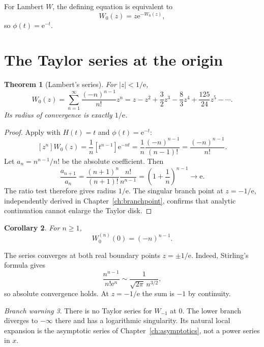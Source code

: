 \documentclass[11pt,oneside]{book}
\newtheorem{theorem}{Theorem}[chapter]
\newtheorem{corollary}[theorem]{Corollary}
\theoremstyle{definition}
\theoremstyle{remark}
\newtheorem{warning}[theorem]{Branch warning}
\newcommand{\ee}{\mathrm e}
\begin{document}
For Lambert $W$, the defining equation is equivalent to
\begin{equation}\label{eq:Wlagrange}
 W_0(z)=z\ee^{-W_0(z)},
\end{equation}
so $\phi(t)=\ee^{-t}$.

\section{The Taylor series at the origin}

\begin{theorem}[Lambert's series]\label{thm:lambertseries}
For $|z|<1/\ee$,
\begin{equation}\label{eq:Wseries}
 W_0(z)=\sum_{n=1}^{\infty}\frac{(-n)^{n-1}}{n!}z^n
 =z-z^2+\frac32z^3-\frac83z^4+\frac{125}{24}z^5-\cdots.
\end{equation}
Its radius of convergence is exactly $1/\ee$.
\end{theorem}

\begin{proof}
Apply  with $H(t)=t$ and $\phi(t)=\ee^{-t}$:
\[
 [z^n]W_0(z)=\frac1n[t^{n-1}]\ee^{-nt}
 =\frac1n\frac{(-n)^{n-1}}{(n-1)!}
 =\frac{(-n)^{n-1}}{n!}.
\]
Let $a_n=n^{n-1}/n!$ be the absolute coefficient.  Then
\[
 \frac{a_{n+1}}{a_n}
 =\frac{(n+1)^n}{(n+1)!}\frac{n!}{n^{n-1}}
 =\left(1+\frac1n\right)^{n-1}\longrightarrow\ee.
\]
The ratio test therefore gives radius $1/\ee$.  The singular branch point at
$z=-1/\ee$, independently derived in Chapter~\ref{ch:branchpoint}, confirms
that analytic continuation cannot enlarge the Taylor disk.
\end{proof}

\begin{corollary}\label{cor:derivativeszero}
For $n\ge1$,
\begin{equation}\label{eq:derivativeszero}
 W_0^{(n)}(0)=(-n)^{n-1}.
\end{equation}
\end{corollary}

The series converges at both real boundary points $z=\pm1/\ee$.  Indeed,
Stirling's formula gives
\[
 \frac{n^{n-1}}{n!\ee^n}\sim\frac1{\sqrt{2\pi}\,n^{3/2}},
\]
so absolute convergence holds.  At $z=-1/\ee$ the sum is $-1$ by continuity.

\begin{warning}
There is no Taylor series for $W_{-1}$ at $0$.  The lower branch diverges to
$-\infty$ there and has a logarithmic singularity.  Its natural local
expansion is the asymptotic series of Chapter~\ref{ch:asymptotics}, not a power
series in $x$.
\end{warning}
\end{document}
